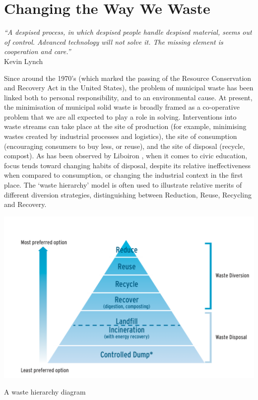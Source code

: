 \documentclass[nofonts,nols,justified,nobib]{tufte-book}
\begin{document}
\section*{Changing the Way We Waste}

\begin{flushright}
\emph{``A despised process, in which despised people handle despised material, seems out of control. Advanced technology will not solve it. The missing element is cooperation and care.''}\cite{lynch_wasting_1990}\\
Kevin Lynch
\end{flushright}


Since around the 1970's (which marked the passing of the Resource Conservation and Recovery Act in the United States), the problem of municipal waste has been linked both to personal responsibility, and to an environmental cause. At present, the minimisation of municipal solid waste is broadly framed as a co-operative problem that we are all expected to play a role in solving. Interventions into waste streams can take place at the site of production (for example, minimising wastes created by industrial processes and logistics), the site of consumption (encouraging consumers to buy less, or reuse), and the site of disposal (recycle, compost). As has been observed by Liboiron \cite{liboiron_against_2014}, when it comes to civic education, focus tends toward changing habits of disposal, despite its relative ineffectiveness when compared to consumption, or changing the industrial context in the first place. The `waste hierarchy' model is often used to illustrate relative merits of different diversion strategies, distinguishing between Reduction, Reuse, Recycling and Recovery.


\begin{marginfigure}
\includegraphics[width=\textwidth]{img/1/recycling-hierarchy.png}
\caption{A waste hierarchy diagram}
\end{marginfigure}
\end{document}
